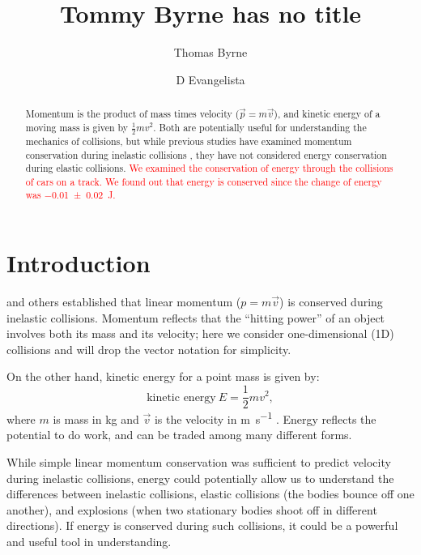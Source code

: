 \documentclass[aps,prl,preprint]{revtex4-1}
\begin{document}
\linenumbers
\title{Tommy Byrne has no title}
\author{Thomas Byrne}
\author{D Evangelista}

\newcommand{\student}[1]{{\textcolor{red}{#1}}}

\begin{abstract}
Momentum is the product of mass times velocity ($\vec{p}=m\vec{v}$), and kinetic energy of a moving mass is given by $\frac{1}{2}mv^2$. Both are potentially useful for understanding the mechanics of collisions, but while previous studies have examined momentum conservation during inelastic collisions \cite{ortega-2021-momentum}, they have not considered energy conservation during elastic collisions. \student{We examined the conservation of energy through the collisions of cars on a track. We found out that energy is conserved since the change of energy was \qty{-0.01\pm0.02}{\joule}.}
\end{abstract}
\maketitle

\section{Introduction}
\cite{ortega-2021-momentum} and others established that linear momentum ($p=m\vec{v}$) is conserved during inelastic collisions. Momentum reflects that the ``hitting power'' of an object involves both its mass and its velocity; here we consider one-dimensional (1D) collisions and will drop the vector notation for simplicity.  

On the other hand, kinetic energy for a point mass is given by:
\begin{equation}
\text{kinetic energy}\ E = \frac{1}{2} m v^2,
\label{eq:energy}
\end{equation}
where $m$ is mass in \si{\kilo\gram} and $\vec{v}$ is the velocity in \si{\meter\per\second} \cite{duchatelet-1741-reponse, coriolis-1829-calcul}. Energy reflects the potential to do work, and can be traded among many different forms. 

While simple linear momentum conservation was sufficient to predict velocity during inelastic collisions, energy could potentially allow us to understand the differences between  inelastic collisions, elastic collisions (the bodies bounce off one another), and explosions (when two stationary bodies shoot off in different directions). If energy is conserved during such collisions, it could be a powerful and useful tool in understanding.
\end{document}

